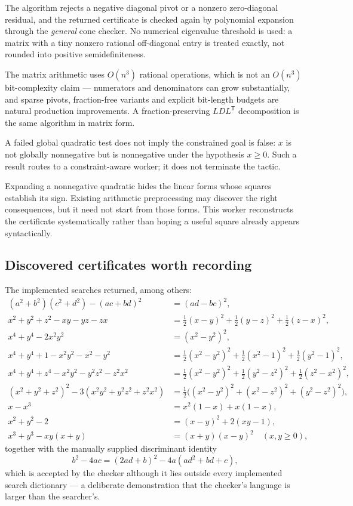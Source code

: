 The algorithm rejects a negative diagonal pivot or a nonzero zero-diagonal
residual, and the returned certificate is checked again by polynomial expansion
through the \emph{general} cone checker. No numerical eigenvalue threshold is
used: a matrix with a tiny nonzero rational off-diagonal entry is treated
exactly, not rounded into positive semidefiniteness.

The matrix arithmetic uses $O(n^3)$ rational operations, which is not an
$O(n^3)$ bit-complexity claim --- numerators and denominators can grow
substantially, and sparse pivots, fraction-free variants and explicit bit-length
budgets are natural production improvements. A fraction-preserving
$LDL^{\mathsf T}$ decomposition is the same algorithm in matrix form.

A failed global quadratic test does not imply the constrained goal is false: $x$
is not globally nonnegative but is nonnegative under the hypothesis $x\ge0$.
Such a result routes to a constraint-aware worker; it does not terminate the
tactic.

Expanding a nonnegative quadratic hides the linear forms whose squares establish
its sign. Existing arithmetic preprocessing may discover the right consequences,
but it need not start from those forms. This worker reconstructs the certificate
systematically rather than hoping a useful square already appears syntactically.

\subsection{Discovered certificates worth recording}

The implemented searches returned, among others:
\begin{align*}
 (a^2+b^2)(c^2+d^2)-(ac+bd)^2&=(ad-bc)^2,\\
 x^2+y^2+z^2-xy-yz-zx
   &=\tfrac12(x-y)^2+\tfrac12(y-z)^2+\tfrac12(z-x)^2,\\
 x^4+y^4-2x^2y^2&=(x^2-y^2)^2,\\
 x^4+y^4+1-x^2y^2-x^2-y^2
   &=\tfrac12(x^2-y^2)^2+\tfrac12(x^2-1)^2+\tfrac12(y^2-1)^2,\\
 x^4+y^4+z^4-x^2y^2-y^2z^2-z^2x^2
   &=\tfrac12(x^2-y^2)^2+\tfrac12(y^2-z^2)^2+\tfrac12(z^2-x^2)^2,\\
 (x^2+y^2+z^2)^2-3(x^2y^2+y^2z^2+z^2x^2)
   &=\tfrac12\bigl((x^2-y^2)^2+(x^2-z^2)^2+(y^2-z^2)^2\bigr),\\
 x-x^3&=x^2(1-x)+x(1-x),\\
 x^2+y^2-2&=(x-y)^2+2(xy-1),\\
 x^3+y^3-xy(x+y)&=(x+y)(x-y)^2\quad(x,y\ge0),
\end{align*}
together with the manually supplied discriminant identity
\begin{equation}\label{eq:disc}
 b^2-4ac=(2ad+b)^2-4a(ad^2+bd+c),
\end{equation}
which is accepted by the checker although it lies outside every implemented
search dictionary --- a deliberate demonstration that the checker's language is
larger than the searcher's.

